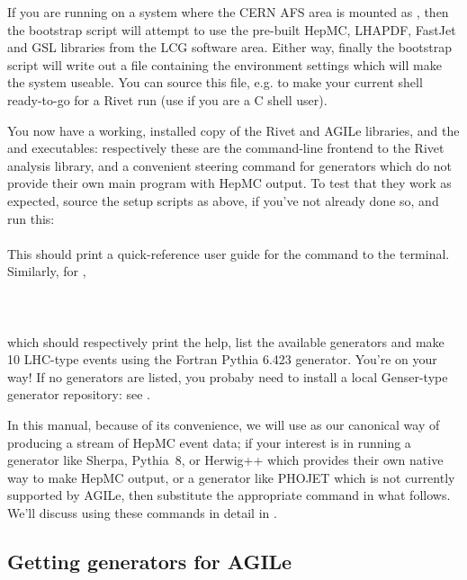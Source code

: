 If you are running on a system where the CERN AFS area is mounted as
, then the bootstrap script will attempt to use the pre-built
HepMC\cite{Dobbs:2001ck}, LHAPDF\cite{Whalley:2005nh},
FastJet\cite{Cacciari:2005hq,fastjetweb} and GSL libraries from the LCG software area.
Either way, finally the bootstrap script will write out a file containing the
environment settings which will make the system useable. You can source this
file, e.g.  to make your current shell ready-to-go
for a Rivet run (use  if you are a C shell user).

You now have a working, installed copy of the Rivet and AGILe libraries, and the
 and  executables: respectively these are the
command-line frontend to the Rivet analysis library, and a convenient steering
command for generators which do not provide their own main program with HepMC
output. To test that they work as expected, source the setup scripts as above,
if you've not already done so, and run this:\\
\\
%
This should print a quick-reference user guide for the  command to
the terminal. Similarly, for ,\\
\\
\\
\\
which should respectively print the help, list the available generators and make
10 LHC-type events using the Fortran Pythia\cite{Sjostrand:2006za} 6.423 generator. You're on your
way! If no generators are listed, you probaby need to install a local
Genser-type generator repository: see .

In this manual, because of its convenience, we will use  as our
canonical way of producing a stream of HepMC event data; if your interest is in
running a generator like Sherpa\cite{Gleisberg:2008ta},
Pythia~8\cite{Sjostrand:2007gs,Sjostrand:2008vc}, or Herwig++\cite{Bahr:2008pv}
which provides their own native way to make HepMC output, or a generator like
PHOJET which is not currently supported by AGILe, then substitute the
appropriate command in what follows.  We'll discuss using these commands in
detail in .


\subsection{Getting generators for AGILe}
\label{sec:genser}


